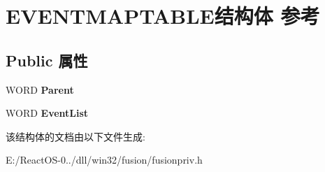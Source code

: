 \hypertarget{struct_e_v_e_n_t_m_a_p_t_a_b_l_e}{}\section{E\+V\+E\+N\+T\+M\+A\+P\+T\+A\+B\+L\+E结构体 参考}
\label{struct_e_v_e_n_t_m_a_p_t_a_b_l_e}
\subsection*{Public 属性}
\begin{DoxyCompactItemize}
\item 
\mbox{\label{struct_e_v_e_n_t_m_a_p_t_a_b_l_e_a9210c9bc5bd80d0c2b06b1cf6d9fee3f}} 
W\+O\+RD {\bfseries Parent}
\item 
\mbox{\label{struct_e_v_e_n_t_m_a_p_t_a_b_l_e_aed450ce5e888367c34dd03876e864b5c}} 
W\+O\+RD {\bfseries Event\+List}
\end{DoxyCompactItemize}


该结构体的文档由以下文件生成\+:\begin{DoxyCompactItemize}
\item 
E\+:/\+React\+O\+S-\/0../dll/win32/fusion/fusionpriv.\+h\end{DoxyCompactItemize}
